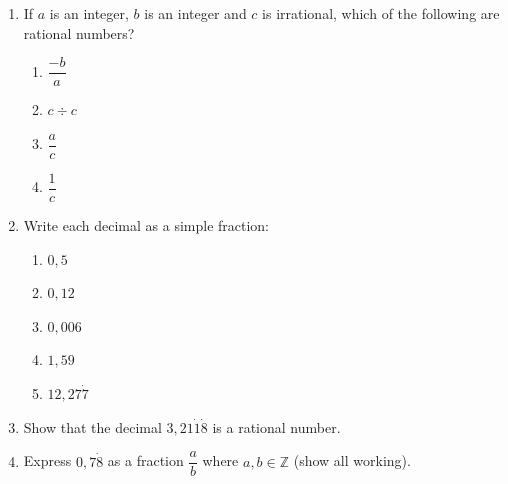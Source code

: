 \begin{eocexercises}{}


\begin{enumerate}[itemsep=5pt, label=\textbf{\arabic*}. ] 
\item If $a$ is an integer, $b$ is an integer and $c$ is irrational, which of the following are rational numbers?
    \begin{enumerate}[itemsep=5pt, label=\textbf{\alph*}. ] 
    \item $\dfrac{-b}{a}$
    \item $c \div c$
    \item $\dfrac{a}{c}$
    \item $\dfrac{1}{c}$
    \end{enumerate}
\item Write each decimal as a simple fraction:
    \begin{enumerate}[itemsep=5pt, label=\textbf{\alph*}. ] 
    \item $0,5$\label{m38348*uid48}
    \item $0,12$\label{m38348*uid49}
    \item $0,006$\label{m38348*uid50}
    \item $1,59$\label{m38348*uid51}
    \item $12,27\dot{7}$
    \end{enumerate}

\item Show that the decimal $3,21\dot{1}\dot{8}$ is a rational number.
\item Express $0,7\dot{8}$ as a fraction $\dfrac{a}{b}$ where $a,b\in \mathbb{Z}$ (show all working).




\end{enumerate}
\end{eocexercises}
